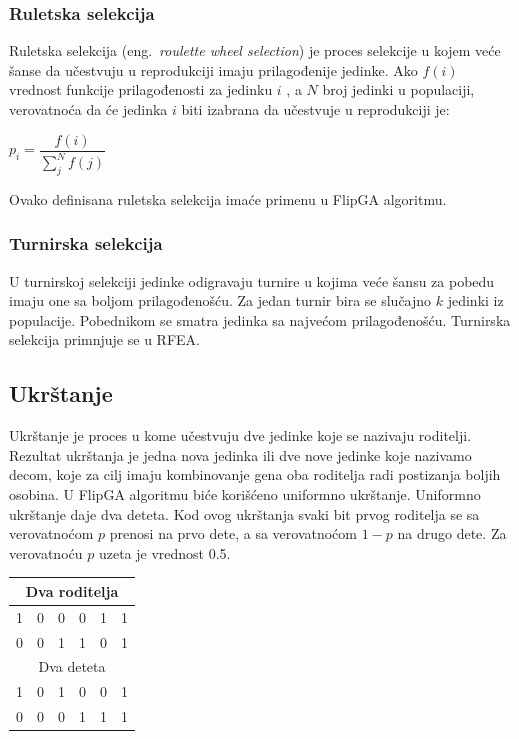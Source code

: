 \documentclass[a4paper]{article}
\begin{document}
\subsubsection{Ruletska selekcija}
\label{sec:ea_ruletska}
Ruletska selekcija (eng.~{\em roulette wheel selection}) \cite{vi_Janicic} je proces 
selekcije u kojem veće šanse da učestvuju u reprodukciji imaju prilagođenije jedinke.
Ako $f(i)$ vrednost funkcije prilagođenosti za jedinku $i$ , a $N$ broj jedinki u populaciji,
verovatnoća da će jedinka $i$ biti izabrana da učestvuje u reprodukciji je:

\begin{center}
$p_i = \dfrac{f(i)}{\sum_{j}^{N} f(j)} $
\end{center}
Ovako definisana ruletska selekcija imaće primenu u FlipGA algoritmu.

\subsubsection{Turnirska selekcija}
\label{sec:ea_turnirska}
U turnirskoj selekciji \cite{vi_Janicic} jedinke odigravaju turnire u kojima veće šansu za
pobedu imaju one sa boljom prilagođenošću. Za jedan turnir bira se slučajno $k$ jedinki iz
populacije. Pobednikom se smatra jedinka sa najvećom prilagođenošću. 
Turnirska selekcija primnjuje se u RFEA.

\subsection{Ukrštanje}
 \label{sec:ea_ukrstanje}
Ukrštanje \cite{vi_Janicic} je proces u kome učestvuju dve jedinke koje se nazivaju roditelji. 
Rezultat ukrštanja je jedna nova jedinka ili dve nove jedinke koje nazivamo decom, koje
za cilj imaju kombinovanje gena oba roditelja radi postizanja boljih osobina.
U FlipGA algoritmu biće korišćeno uniformno ukrštanje.
Uniformno ukrštanje daje dva deteta. Kod ovog ukrštanja svaki bit prvog roditelja 
se sa verovatnoćom $p$ prenosi na prvo dete, a sa verovatnoćom $1-p$ na drugo dete. 
Za verovatnoću $p$ uzeta je vrednost 0.5. 

\begin{table}[h!]
\centering
{}\label{tab:ea_ukrstanje} 
\begin{tabular}{|*{6}{c|}}
  \multicolumn{6}{c}{Dva roditelja} \\ \hline
  \rowcolor{Gray}  
  1 & 0 & 0 & 0 & 1 & 1 \\ \hline
  0 & 0 & 1 & 1 & 0 & 1 \\ \hline
  \multicolumn{6}{c}{Dva deteta} \\ \hline
  \cellcolor{Gray} 1 & 0 & 1 & \cellcolor{Gray} 0 & 0 & \cellcolor{Gray} 1 \\ \hline
  0 & \cellcolor{Gray} 0 & \cellcolor{Gray} 0 & 1 & \cellcolor{Gray} 1 & 1 \\ \hline
\end{tabular}
\end{table}
\end{document}
